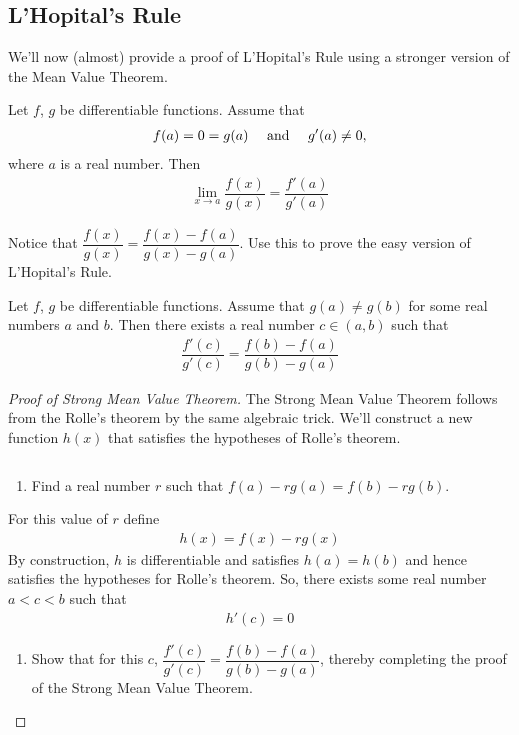 \subsection{L'Hopital's Rule}
We'll now (almost) provide a proof of L'Hopital's Rule using a stronger version of the Mean Value Theorem.
\begin{theorem}
	Let $f$, $g$ be differentiable functions. Assume that
	\begin{align*}
		f(a) = 0 = g(a) \mbox{ \quad and \quad } g'(a) \neq 0,
	\end{align*}
	where $a$ is a real number. Then
	\begin{align*}
		\lim \limits_{x \rightarrow a} \dfrac{f(x)}{g(x)} = \dfrac{f'(a)}{g'(a)}
	\end{align*}
\end{theorem}
\begin{exercise}
	Notice that $\dfrac{f(x)}{g(x)} = \dfrac{f(x) - f(a)}{g(x) - g(a)}$. Use this to prove the easy version of L'Hopital's Rule. 
\end{exercise}

\begin{theorem}
	Let $f$, $g$ be differentiable functions. Assume that $g(a) \neq g(b)$ for some real numbers $a$ and $b$. Then there exists a real number $c \in (a,b)$ such that
	\begin{align*}
		\dfrac{f'(c)}{g'(c)} = \dfrac{f(b) - f(a)}{g(b) - g(a)}
	\end{align*}
\end{theorem}
\begin{proof}[Proof of Strong Mean Value Theorem]
	The Strong Mean Value Theorem follows from the Rolle's theorem by the same algebraic trick. We'll construct a new function $h(x)$ that satisfies the hypotheses of Rolle's theorem.
	\begin{exercise}$ $
		\begin{enumerate}
			\item Find a real number $r$ such that $f(a) - r g(a) = f(b) - r g(b)$.
		\end{enumerate}
		For this value of $r$ define
		\begin{align*}
			h(x) = f(x) - r g(x)
		\end{align*}
		By construction, $h$ is differentiable and satisfies $h(a) = h(b)$ and hence satisfies the hypotheses for Rolle's theorem. So, there exists some real number $ a < c < b$ such that
		\begin{align*}
			h'(c) = 0
		\end{align*}
		\begin{enumerate}[resume]
			\item Show that for this $c$, $\dfrac{f'(c)}{g'(c)} = \dfrac{f(b) - f(a)}{g(b) - g(a)}$, thereby completing the proof of the Strong Mean Value Theorem.
		\end{enumerate}
	\end{exercise}
\end{proof}

